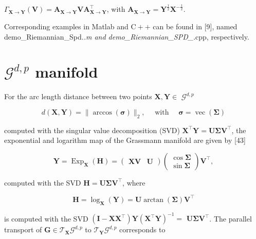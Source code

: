 \documentclass[10pt]{article}
\begin{document}
$\Gamma_{\boldsymbol{X} \rightarrow \boldsymbol{Y}}(\boldsymbol{V})=\boldsymbol{A}_{\boldsymbol{X} \rightarrow \boldsymbol{Y}} \boldsymbol{V} \boldsymbol{A}_{\boldsymbol{X} \rightarrow \boldsymbol{Y}}^{\top}$, with $\boldsymbol{A}_{\boldsymbol{X} \rightarrow \boldsymbol{Y}}=\boldsymbol{Y}^{\frac{1}{2}} \boldsymbol{X}^{-\frac{1}{2}}$.

Corresponding examples in Matlab and $\mathrm{C}++$ can be found in [9], named demo\_Riemannian\_Spd.\textit{.m and demo\_Riemannian\_SPD\_}.cpp, respectively.

\section{$\mathcal{G}^{d, p}$ manifold}
For the arc length distance between two points $\boldsymbol{X}, \boldsymbol{Y} \in$ $\mathcal{G}^{d, p}$

$$
d(\boldsymbol{X}, \boldsymbol{Y})=\|\arccos (\boldsymbol{\sigma})\|_{2}, \quad \text { with } \quad \boldsymbol{\sigma}=\operatorname{vec}(\boldsymbol{\Sigma})
$$

computed with the singular value decomposition (SVD) $\boldsymbol{X}^{\top} \boldsymbol{Y}=\boldsymbol{U} \boldsymbol{\Sigma} \boldsymbol{V}^{\top}$, the exponential and logarithm map of the Grassmann manifold are given by [43]

$$
\boldsymbol{Y}=\operatorname{Exp}_{\boldsymbol{X}}(\boldsymbol{H})=\left(\begin{array}{ll}
\boldsymbol{X} \boldsymbol{V} & \boldsymbol{U}
\end{array}\right)\left(\begin{array}{c}
\cos \boldsymbol{\Sigma} \\
\sin \boldsymbol{\Sigma}
\end{array}\right) \boldsymbol{V}^{\top},
$$

computed with the SVD $\boldsymbol{H}=\boldsymbol{U} \boldsymbol{\Sigma} \boldsymbol{V}^{\top}$, where

$$
\boldsymbol{H}=\log _{\boldsymbol{X}}(\boldsymbol{Y})=\boldsymbol{U} \arctan (\boldsymbol{\Sigma}) \boldsymbol{V}^{\top}
$$

is computed with the SVD $\left(\boldsymbol{I}-\boldsymbol{X} \boldsymbol{X}^{\top}\right) \boldsymbol{Y}\left(\boldsymbol{X}^{\top} \boldsymbol{Y}\right)^{-1}=$ $\boldsymbol{U} \boldsymbol{\Sigma} \boldsymbol{V}^{\top}$. The parallel transport of $\boldsymbol{G} \in \mathcal{T}_{\boldsymbol{X}} \mathcal{G}^{d, p}$ to $\mathcal{T}_{\boldsymbol{Y}} \mathcal{G}^{d, p}$ corresponds to
\end{document}
